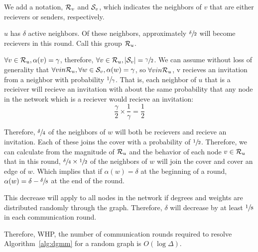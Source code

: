 \begin{IEEEproof}
\begin{IEEEproof}
We add a notation, ${\mathcal R}_v$ and ${\mathcal S}_v$, which indicates the neighbors of $v$ that are either recievers or senders, respectively.

$u$ has $\delta$ active neighbors. Of these neighbors, approximately $\sfrac{\delta}{2}$ will become recievers in this round. Call this group ${\mathcal R}_u$. 

$\forall v \in {\mathcal R}_u, \alpha(v) = \gamma$, therefore, $\forall v \in {\mathcal R}_u, |{\mathcal S}_v| = \sfrac{\gamma}{2}$. We can assume without loss of generality that $\forall v in {\mathcal R}_u, \forall w \in {\mathcal S}_v, \alpha(w) = \gamma$, so $\forall v in {\mathcal R}_u$, v recieves an invitation from a neighbor with probability $\sfrac{1}{\gamma}$. That is, each neighbor of $u$ that is a recieiver will recieve an invitation with about the same probability that any node in the network which is a reciever would recieve an invitation:\begin{equation*}\frac{\gamma}{2} \times \frac{1}{\gamma} = \frac{1}{2}\end{equation*}

Therefore, $\sfrac{\delta}{4}$ of the neighbors of $w$ will both be recievers and recieve an invitation. Each of these joins the cover with a probability of $\sfrac{1}{2}$. Therefore, we can calculate from the magnitude of ${\mathcal R}_u$ and the behavior of each node $v \in {\mathcal R}_u$ that in this round, $\sfrac{\delta}{4}\times \sfrac{1}{2}$ of the neighbors of $w$ will join the cover and cover an edge of $w$. Which implies that if $\alpha(w) = \delta$ at the beginning of a round, $\alpha(w) = \delta-\sfrac{\delta}{8}$ at the end of the round.

This decrease will apply to all nodes in the network if degrees and weights are distributed randomly through the graph. Therefore, $\delta$ will decrease by at least $\sfrac{1}{8}$ in each communication round. 
\end{IEEEproof}

Therefore, WHP, the number of communication rounds required to resolve Algorithm~\ref{alg:dgmm} for a random graph is $O(\log\Delta)$.

\end{IEEEproof} 
